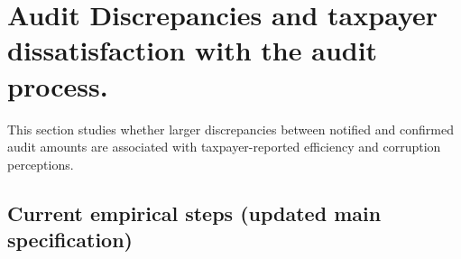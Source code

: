 \section{Audit Discrepancies and taxpayer dissatisfaction with the audit process.}
\label{sec:audit_discrepancy_taxpayer}
\providecommand{\sym}[1]{\ifmmode^{#1}\else\(^{#1}\)\fi}

\makeatletter
{}
\makeatother

This section studies whether larger discrepancies between notified and confirmed audit amounts are associated with taxpayer-reported efficiency and corruption perceptions.

\subsection{Current empirical steps (updated main specification)}
